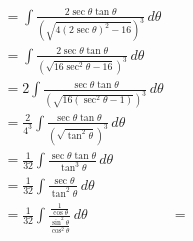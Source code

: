 \documentclass[preview]{standalone}
\begin{document}
\begin{align*}
&= \int \frac{2\sec\theta\tan\theta}{(\sqrt{4(2\sec\theta)^2-16})^3} \, d\theta \\ &=\int \frac{2\sec\theta\tan\theta}{(\sqrt{16\sec^2\theta-16})^3} \, d\theta \\ &=2\int \frac{\sec\theta\tan\theta}{(\sqrt{16(\sec^2\theta-1)})^3} \, d\theta \\ &=\frac{2}{4^3} \int \frac{\sec\theta\tan\theta}{(\sqrt{\tan^2\theta})^3} \, d\theta \\ &=\frac{1}{32} \int \frac{\sec\theta\tan\theta}{\tan^3\theta} \, d\theta \\ &=\frac{1}{32} \int \frac{\sec\theta}{\tan^2\theta }\, d\theta \\&=\frac{1}{32} \int \frac{\frac{1}{\cos\theta}}{\frac{\sin^2\theta}{\cos^2\theta}} \, d\theta&=
\end{align*}
\end{document}

